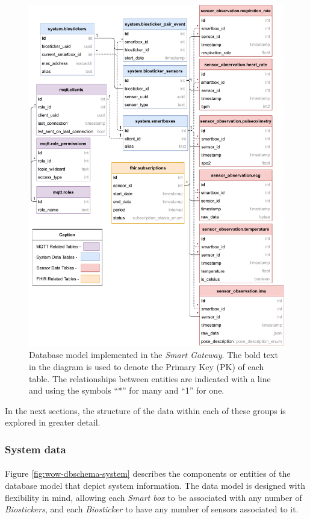 \begin{figure}[H]
    \centering
    \includegraphics[width=0.9\linewidth]{images/database-schema-general.pdf}
    \caption[Database model implemented in the \textit{Smart Gateway}.]{Database model implemented in the \textit{Smart Gateway}. The bold text in the diagram is used to denote the Primary Key (PK) of each table. The relationships between entities are indicated with a line and using the symbols ``*'' for many and ``1'' for one.}
    \label{fig:wow-dbschema-full}
\end{figure}

In the next sections, the structure of the data within each of these groups is explored in greater detail.

\subsubsection{System data}
\paragraph{} Figure \ref{fig:wow-dbschema-system} describes the components or entities of the database model that depict system information. The data model is designed with flexibility in mind, allowing each \textit{Smart box} to be associated with any number of \textit{Biostickers}, and each \textit{Biosticker} to have any number of sensors associated to it. 


